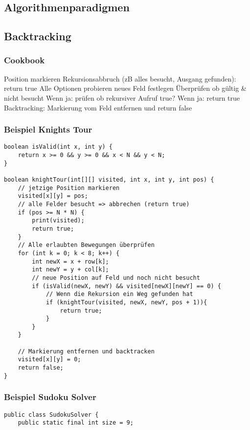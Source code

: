 \begin{multicols*}{4}
\section{Algorithmenparadigmen}
	\subsection{Backtracking}
		\subsubsection{Cookbook}
			\renewcommand{\outlineii}{enumerate}
			\renewcommand{\outlineiii}{enumerate}
			\begin{outline}
				\1 Position markieren
				\1 Rekursionsabbruch (zB alles besucht, Ausgang gefunden): return true 
				\1 Alle Optionen probieren
					\2 neues Feld festlegen
					\2 Überprüfen ob gültig \& nicht besucht
						\3 Wenn ja: prüfen ob rekursiver Aufruf true? 
							\4 Wenn ja: return true
				\1 Backtracking: Markierung vom Feld entfernen und return false
			\end{outline}
			\renewcommand{\outlineii}{itemize}
			\renewcommand{\outlineiii}{itemize}
		
		\subsubsection{Beispiel Knights Tour}
			\begin{lstlisting}
boolean isValid(int x, int y) {
	return x >= 0 && y >= 0 && x < N && y < N;
}

boolean knightTour(int[][] visited, int x, int y, int pos) {
	// jetzige Position markieren
	visited[x][y] = pos;
	// alle Felder besucht => abbrechen (return true)
	if (pos >= N * N) {
		print(visited);
		return true;
	}
	// Alle erlaubten Bewegungen überprüfen
	for (int k = 0; k < 8; k++) {
		int newX = x + row[k];
		int newY = y + col[k];
		// neue Position auf Feld und noch nicht besucht
		if (isValid(newX, newY) && visited[newX][newY] == 0) {
			// Wenn die Rekursion ein Weg gefunden hat
			if (knightTour(visited, newX, newY, pos + 1)){
				return true;
			}
		}
	}
	
	// Markierung entfernen und backtracken
	visited[x][y] = 0;
	return false;
}
			\end{lstlisting}
		
		\subsubsection{Beispiel Sudoku Solver}
			\begin{lstlisting}
public class SudokuSolver { 
	public static final int size = 9; 
	

\end{lstlisting}
\end{multicols*}
